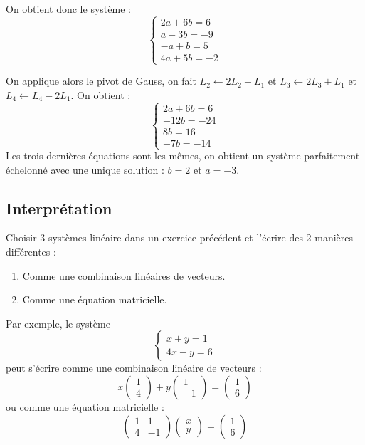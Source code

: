 \begin{enumerate}[label=\alph*)]
{\begin{mdframed}
  On obtient donc le système :
  $$\begin{cases}
    2a + 6b = 6 \\
    a - 3b = -9 \\
    -a + b = 5 \\
    4a + 5b = -2
  \end{cases}$$

  On applique alors le pivot de Gauss, on fait $L_2 \leftarrow 2L_2 - L_1$ et $L_3 \leftarrow 2L_3 + L_1$ et $L_4 \leftarrow L_4 - 2L_1$. On obtient :
  $$\begin{cases}
    2a + 6b = 6 \\
    -12b = -24 \\
    8b = 16 \\
    -7b = -14
  \end{cases}$$
  Les trois dernières équations sont les mêmes, on obtient un système parfaitement échelonné avec une unique solution : $b=2$ et $a =-3$.

  \end{mdframed}
}{
}


\end{enumerate}


\vspace{2em}
\subsection{Interprétation}
Choisir 3 systèmes linéaire dans un exercice précédent et l'écrire des 2 manières différentes : 
\begin{enumerate}
\item Comme une combinaison linéaires de vecteurs.
\item Comme une équation matricielle.
\end{enumerate}

Par exemple, le système 
$$\begin{cases}
x + y = 1 \\
4x - y = 6
\end{cases}$$
peut s'écrire comme une combinaison linéaire de vecteurs :
$$x\begin{pmatrix}1\\4\end{pmatrix} + y\begin{pmatrix}1\\-1\end{pmatrix} = \begin{pmatrix}1\\6\end{pmatrix}$$
ou comme une équation matricielle :
$$\begin{pmatrix}1&1\\4&-1\end{pmatrix}\begin{pmatrix}x\\y\end{pmatrix} = \begin{pmatrix}1\\6\end{pmatrix}$$



